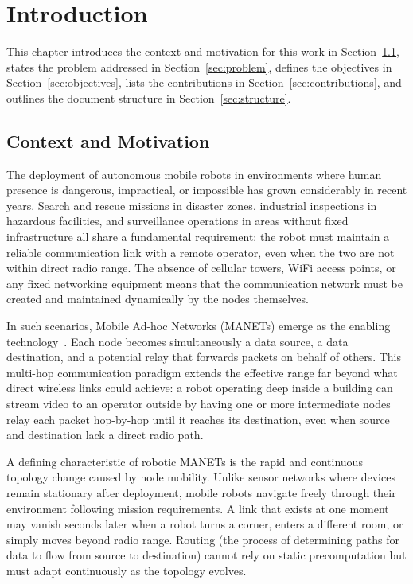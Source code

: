 
\chapter{Introduction}
\label{chap:intro}

This chapter introduces the context and motivation for this work in
Section~\ref{sec:context}, states the problem addressed in
Section~\ref{sec:problem}, defines the objectives in
Section~\ref{sec:objectives}, lists the contributions in
Section~\ref{sec:contributions}, and outlines the document structure in
Section~\ref{sec:structure}.

\section{Context and Motivation}
\label{sec:context}

The deployment of autonomous mobile robots in environments where human presence
is dangerous, impractical, or impossible has grown considerably in recent years.
Search and rescue missions in disaster zones, industrial inspections in
hazardous facilities, and surveillance operations in areas without fixed
infrastructure all share a fundamental requirement: the robot must maintain a
reliable communication link with a remote operator, even when the two are not
within direct radio range. The absence of cellular towers, WiFi access points,
or any fixed networking equipment means that the communication network must be
created and maintained dynamically by the nodes themselves.

In such scenarios, Mobile Ad-hoc Networks (MANETs) emerge as the enabling
technology~\cite{conti2014mobile}. Each node becomes simultaneously a data
source, a data destination, and a potential relay that forwards packets on
behalf of others. This multi-hop communication paradigm extends the effective
range far beyond what direct wireless links could achieve: a robot operating
deep inside a building can stream video to an operator outside by having one
or more intermediate nodes relay each packet hop-by-hop until it reaches its
destination, even when source and destination lack a direct radio path.

A defining characteristic of robotic MANETs is the rapid and continuous
topology change caused by node mobility. Unlike sensor networks where devices
remain stationary after deployment, mobile robots navigate freely through their
environment following mission requirements. A link that exists at one moment
may vanish seconds later when a robot turns a corner, enters a different room,
or simply moves beyond radio range. Routing (the process of determining
paths for data to flow from source to destination) cannot rely on static
precomputation but must adapt continuously as the topology evolves.

